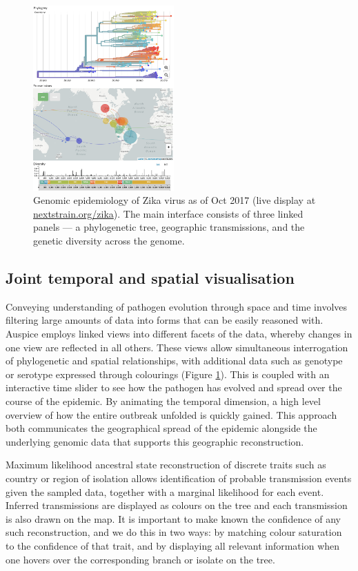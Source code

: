 \documentclass{bioinfo}
\begin{document}
\begin{figure}[!tpb]
\centerline{\includegraphics[width=0.48\textwidth]{figure}}
\caption{Genomic epidemiology of Zika virus as of Oct 2017 (live display at \href{http://nextstrain.org/zika}{nextstrain.org/zika}). The main interface consists of three linked panels --- a phylogenetic tree, geographic transmissions, and the genetic diversity across the genome.}
\label{nextstrain}
\end{figure}


\subsection*{Joint temporal and spatial visualisation}
Conveying understanding of pathogen evolution through space and time involves filtering large amounts of data into forms that can be easily reasoned with.
Auspice employs linked views into different facets of the data, whereby changes in one view are reflected in all others.
These views allow simultaneous interrogation of phylogenetic and spatial relationships, with additional data such as genotype or serotype expressed through colourings (Figure \ref{nextstrain}).
This is coupled with an interactive time slider to see how the pathogen has evolved and spread over the course of the epidemic.
By animating the temporal dimension, a high level overview of how the entire outbreak unfolded is quickly gained.
This approach both communicates the geographical spread of the epidemic alongside the underlying genomic data that supports this geographic reconstruction.

Maximum likelihood ancestral state reconstruction of discrete traits such as country or region of isolation allows identification of probable transmission events given the sampled data, together with a marginal likelihood for each event.
Inferred transmissions are displayed as colours on the tree and each transmission is also drawn on the map.
It is important to make known the confidence of any such reconstruction, and we do this in two ways: by matching colour saturation to the confidence of that trait, and by displaying all relevant information when one hovers over the corresponding branch or isolate on the tree.
\end{document}
